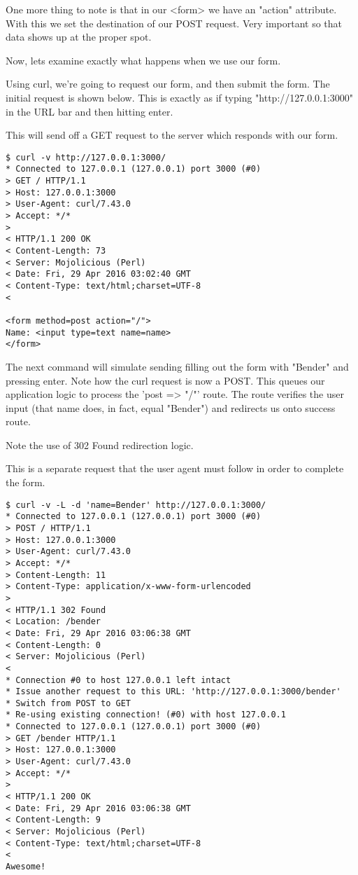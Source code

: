 \documentclass[14pt]{extreport}
\begin{document}
One more thing to note is that in our <form> we have an "action" attribute.
With this we set the destination of our POST request.  Very important so that
data shows up at the proper spot.



Now, lets examine exactly what happens when we use our form. 

Using curl, we're going to request our form, and then submit the form.  The initial
request is shown below.  This is exactly as if typing "http://127.0.0.1:3000" in the
URL bar and then hitting enter.

This will send off a GET request to the server which responds with our form.

\begin{lstlisting}[style=BashOutputStyle]
$ curl -v http://127.0.0.1:3000/
* Connected to 127.0.0.1 (127.0.0.1) port 3000 (#0)
> GET / HTTP/1.1
> Host: 127.0.0.1:3000
> User-Agent: curl/7.43.0
> Accept: */*
> 
< HTTP/1.1 200 OK
< Content-Length: 73
< Server: Mojolicious (Perl)
< Date: Fri, 29 Apr 2016 03:02:40 GMT
< Content-Type: text/html;charset=UTF-8
< 

<form method=post action="/">
Name: <input type=text name=name>
</form>
\end{lstlisting}

The next command will simulate sending filling out the form with "Bender" and
pressing enter.  Note how the curl request is now a POST.  This queues our
application logic to process the 'post => "/"' route.  The route verifies the
user input (that name does, in fact, equal "Bender") and redirects us onto
success route.

Note the use of 302 Found redirection logic.

This is a separate request that the user agent must follow in order to complete
the form.

\begin{lstlisting}[style=BashOutputStyle]
$ curl -v -L -d 'name=Bender' http://127.0.0.1:3000/
* Connected to 127.0.0.1 (127.0.0.1) port 3000 (#0)
> POST / HTTP/1.1
> Host: 127.0.0.1:3000
> User-Agent: curl/7.43.0
> Accept: */*
> Content-Length: 11
> Content-Type: application/x-www-form-urlencoded
> 
< HTTP/1.1 302 Found
< Location: /bender
< Date: Fri, 29 Apr 2016 03:06:38 GMT
< Content-Length: 0
< Server: Mojolicious (Perl)
< 
* Connection #0 to host 127.0.0.1 left intact
* Issue another request to this URL: 'http://127.0.0.1:3000/bender'
* Switch from POST to GET
* Re-using existing connection! (#0) with host 127.0.0.1
* Connected to 127.0.0.1 (127.0.0.1) port 3000 (#0)
> GET /bender HTTP/1.1
> Host: 127.0.0.1:3000
> User-Agent: curl/7.43.0
> Accept: */*
> 
< HTTP/1.1 200 OK
< Date: Fri, 29 Apr 2016 03:06:38 GMT
< Content-Length: 9
< Server: Mojolicious (Perl)
< Content-Type: text/html;charset=UTF-8
< 
Awesome!
\end{lstlisting}
\end{document}
